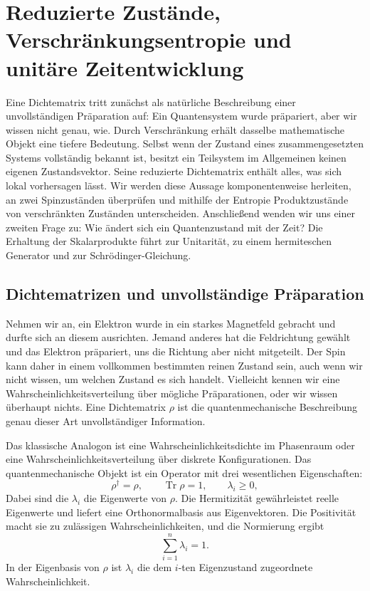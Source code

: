 \chapter{Reduzierte Zustände, Verschränkungsentropie und unitäre Zeitentwicklung}

Eine Dichtematrix tritt zunächst als natürliche Beschreibung einer unvollständigen Präparation auf: Ein Quantensystem wurde präpariert, aber wir wissen nicht genau, wie. Durch Verschränkung erhält dasselbe mathematische Objekt eine tiefere Bedeutung. Selbst wenn der Zustand eines zusammengesetzten Systems vollständig bekannt ist, besitzt ein Teilsystem im Allgemeinen keinen eigenen Zustandsvektor. Seine reduzierte Dichtematrix enthält alles, was sich lokal vorhersagen lässt. Wir werden diese Aussage komponentenweise herleiten, an zwei Spinzuständen überprüfen und mithilfe der Entropie Produktzustände von verschränkten Zuständen unterscheiden. Anschließend wenden wir uns einer zweiten Frage zu: Wie ändert sich ein Quantenzustand mit der Zeit? Die Erhaltung der Skalarprodukte führt zur Unitarität, zu einem hermiteschen Generator und zur Schr\"odinger-Gleichung.

\section{Dichtematrizen und unvollständige Präparation}

Nehmen wir an, ein Elektron wurde in ein starkes Magnetfeld gebracht und durfte sich an diesem ausrichten. Jemand anderes hat die Feldrichtung gewählt und das Elektron präpariert, uns die Richtung aber nicht mitgeteilt. Der Spin kann daher in einem vollkommen bestimmten reinen Zustand sein, auch wenn wir nicht wissen, um welchen Zustand es sich handelt. Vielleicht kennen wir eine Wahrscheinlichkeitsverteilung über mögliche Präparationen, oder wir wissen überhaupt nichts. Eine Dichtematrix \(\rho\) ist die quantenmechanische Beschreibung genau dieser Art unvollständiger Information.

Das klassische Analogon ist eine Wahrscheinlichkeitsdichte im Phasenraum oder eine Wahrscheinlichkeitsverteilung über diskrete Konfigurationen. Das quantenmechanische Objekt ist ein Operator mit drei wesentlichen Eigenschaften:
\begin{equation}
\rho^\dagger=\rho,
\qquad
\operatorname{Tr}\rho=1,
\qquad
\lambda_i\geq 0,
\end{equation}
Dabei sind die \(\lambda_i\) die Eigenwerte von \(\rho\). Die Hermitizität gewährleistet reelle Eigenwerte und liefert eine Orthonormalbasis aus Eigenvektoren. Die Positivität macht sie zu zulässigen Wahrscheinlichkeiten, und die Normierung ergibt
\begin{equation}
\sum_{i=1}^{n}\lambda_i=1.
\end{equation}
In der Eigenbasis von \(\rho\) ist \(\lambda_i\) die dem \(i\)-ten Eigenzustand zugeordnete Wahrscheinlichkeit.

